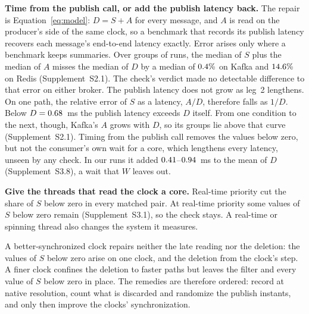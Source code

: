 \documentclass[10pt,journal,compsoc]{IEEEtran}
\newcommand{\kafka}{Kafka}
\newcommand{\redis}{Redis}
\begin{document}
\textbf{Time from the publish call, or add the publish latency back.}\label{sec:cost}
The repair is Equation~\ref{eq:model}: $D = S + A$ for every message, and $A$ is read on the producer's side of
the same clock, so a benchmark that records its publish latency recovers each message's end-to-end
latency exactly. Error arises only where a benchmark keeps summaries. Over groups of runs,
the median of $S$ plus the median of $A$ misses the median of $D$ by a median of $0.4\%$ on \kafka{} and $14.6\%$ on \redis{} (Supplement~S2.1). The check's verdict made no detectable difference to that error on either broker.
The publish latency does not grow as leg~2 lengthens. On one path, the relative error of $S$ as a latency, $A/D$, therefore falls
as $1/D$. 
Below $D = 0.68$~ms
the publish latency exceeds $D$ itself. From one condition to the next, though, \kafka{}'s $A$ grows with $D$, so its groups lie above that curve (Supplement~S2.1). Timing from the publish call removes
the values below zero, but not the consumer's own wait for a core, which lengthens every latency,
unseen by any check. In our runs it added $0.41$--$0.94$~ms to the mean of $D$ (Supplement~S3.8), a wait that $W$ leaves out.

\textbf{Give the threads that read the clock a core.} Real-time priority cut the share of $S$
below zero in every matched pair. At real-time priority some values of $S$ below zero
remain (Supplement~S3.1), so the check stays. A real-time or spinning thread also changes the system it measures.

A better-synchronized clock repairs neither the late reading nor the deletion: the values of $S$
below zero arise on one clock, and the deletion from the clock's step. A finer clock confines the
deletion to faster paths but leaves the filter and every value of $S$ below zero in place. The
remedies are therefore ordered: record at native resolution, count what is discarded and randomize
the publish instants, and only then improve the clocks' synchronization.

\end{document}
